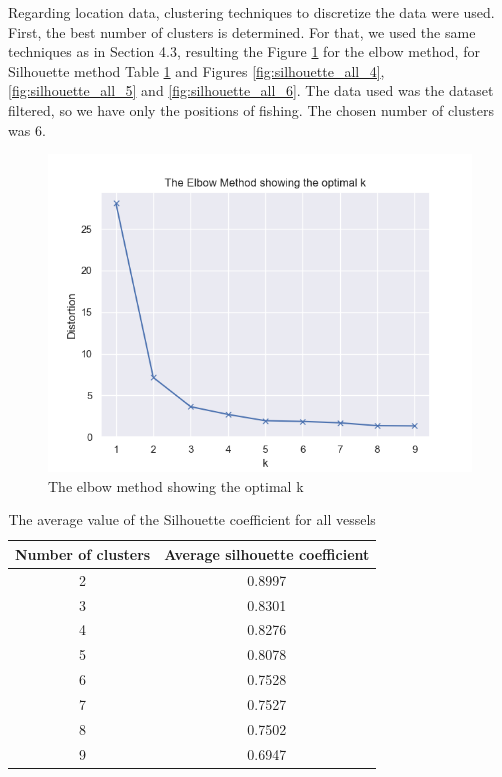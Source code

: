 Regarding location data, clustering techniques to discretize the data were used.
First, the best number of clusters is determined. For that, we used the same techniques as in Section 4.3, resulting the Figure \ref{fig:elbow_method_server} for the elbow method, for Silhouette method Table \ref{table:all_silhouette} and Figures \ref{fig:silhouette_all_4}, \ref{fig:silhouette_all_5} and \ref{fig:silhouette_all_6}.
The data used was the dataset filtered, so we have only the positions of fishing. The chosen number of clusters was 6.

\begin{figure}[H]
\centering
\includegraphics[width=0.8\linewidth]{Chapters/img/elbow_method_server.png}
\caption{The elbow method showing the optimal k}
\label{fig:elbow_method_server}
\end{figure}

\begin {table}[h]
\caption {The average value of the Silhouette coefficient for all vessels}
\begin{center}
\begin{tabular}{c|c}
\textbf{Number of clusters} & \textbf{Average silhouette coefficient}  \\
\hline
2 & 0.8997  \\
3 & 0.8301  \\
4 & 0.8276  \\
5 & 0.8078  \\
6 & 0.7528  \\
7 & 0.7527  \\
8 & 0.7502  \\
9 & 0.6947  
\label{table:all_silhouette}
\end{tabular}
\end{center}
\end {table}


